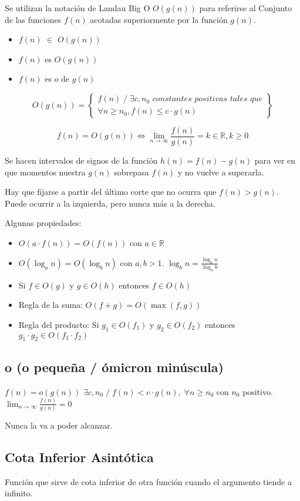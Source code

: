 Se utilizan la notación de Landau Big O $O(g(n))$ para referirse al Conjunto de las funciones $f(n)$ acotadas superiormente por la función $g(n)$.
\begin{itemize}
  \item $f(n)$ $\in$ $O(g(n))$
  \item $f(n)$ es $O(g(n))$
  \item $f(n)$ es $o$ de $g(n)$
\end{itemize}

$$O(g(n))=\left\{\begin{matrix}
  f(n)\;/\;\exists c, n_0 \textit{ constantes positivas tales que}  \\
  \forall n \geq n_0, f(n) \leq c \cdot g(n)
  \end{matrix}\right\}$$

$$f(n)=O(g(n)) \Leftrightarrow \lim_{n \rightarrow \infty} \frac{f(n)}{g(n)}= k \in \mathbb{R}, k \geq 0$$

Se hacen intervalos de signos de la función $h(n) = f(n)-g(n)$ para ver en que momentos nuestra $g(n)$ sobrepasa $f(n)$ y no vuelve a superarla.

Hay que fijarse a partir del último corte que no ocurra que $f(n) > g(n)$. Puede ocurrir a la izquierda, pero nunca más a la derecha.

Algunas propiedades:
\begin{itemize}
  \item $O(a \cdot f(n))= O(f(n))$ con $a \in \mathbb{R}$
  \item $O(\log_a n) = O(\log_b n)$ con $a,b > 1$. $\log_b n = \frac{\log_a n}{\log_a b}$
  \item Si $f \in O(g)$ y $g \in O(h)$ entonces $f \in O(h)$
  \item Regla de la suma: $O(f+g)=O(\max(f, g))$
  \item Regla del producto: Si $g_1 \in O(f_1)$ y $g_2 \in O(f_2)$ entonces $g_1 \cdot g_2 \in O(f_1 \cdot f_2)$
\end{itemize}

\subsection{o (o pequeña / ómicron minúscula)}
$f(n)=o(g(n))$ $\exists c, n_0\;/\; f(n)<c\cdot g(n), \; \forall n \geq n_0$ con $n_0$ positivo. $\lim_{n \rightarrow \infty} \frac{f(n)}{g(n)}=0$

Nunca la va a poder alcanzar.

\subsection{Cota Inferior Asintótica}
Función que sirve de cota inferior de otra función cuando el argumento tiende a infinito.

